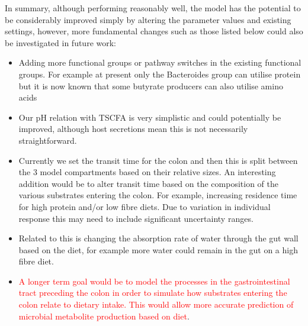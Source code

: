 \documentclass[a4paper]{article}
\begin{document}
In summary, although performing reasonably well, the model has the potential to be considerably improved simply by altering the parameter values and existing settings, however, more fundamental changes such as those listed below could also be investigated in future work:
\begin{itemize}
\item Adding more functional groups or pathway switches in the existing functional groups. For example at present only the Bacteroides group can utilise protein but it is now known that some butyrate producers can also utilise amino acids \citep{louis17}
\item Our pH relation with TSCFA is very simplistic and could potentially be improved, although host secretions mean this is not necessarily straightforward.
\item Currently we set the transit time for the colon and then this is split between the 3 model compartments based on their relative sizes. An interesting addition would be to alter transit time based on the composition of the various substrates entering the colon. For example, increasing residence time for high protein and/or low fibre diets. Due to variation in individual response this may need to include significant uncertainty ranges.
\item Related to this is changing the absorption rate of water through the gut wall based on the diet, for example more water could remain in the gut on a high fibre diet.
\item \textcolor{red}{A longer term goal would be to model the processes in the gastrointestinal tract preceding the colon in order to simulate how substrates entering the colon relate to dietary intake. This would allow more accurate prediction of microbial metabolite production based on diet}.

\end{itemize} 
\end{document}
